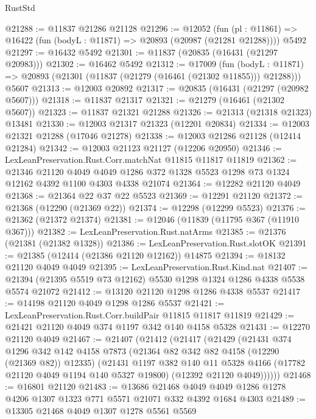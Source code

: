 \begin{lexlean}{RustStd}
\begin{coremodule}
{\begin{coremodule}
{{{{{{{{{{{{{{{{{{{{{{{{{{{{{{{{{{{{{{{{{{{{{{{{{{@21288 := @11837 @21286 @21128
@21296 := @12052
    (fun (pl : @11861) => @16422 (fun (bodyL : @11871) => @20893 (@20987 (@21281 @21288))))
    @5492
@21297 := @16432 @5492
@21301 := @11837 (@20835 (@16431 (@21297 @20983)))
@21302 := @16462 @5492
@21312 := @17009
    (fun (bodyL : @11871) => @20893 (@21301 (@11837 (@21279 (@16461 (@21302 @11855))) @21288)))
    @5607
@21313 := @12003 @20892
@21317 := @20835 (@16431 (@21297 (@20982 @5607)))
@21318 := @11837 @21317
@21321 := @21279 (@16461 (@21302 @5607))
@21323 := @11837 @21321 @21288
@21326 := @21313 (@21318 @21323) @13481
@21330 := @12003 @21317 @21323 (@12201 @20834)
@21334 := @12003 @21321 @21288 (@17046 @21278)
@21338 := @12003 @21286 @21128 (@12414 @21284)
@21342 := @12003 @21123 @21127 (@12206 @20950)
@21346 := LexLeanPreservation.Rust.Corr.matchNat @11815 @11817 @11819
@21362 := @21346
    @21120
    @4049
    @4049
    @1286
    @372
    @1328
    @5523
    @1298
    @73
    @1324
    @12162
    @4392
    @1100
    @4303
    @4338
    @21074
@21364 := @12282 @21120 @4049
@21368 := @21364 @22 @37 @22 @5523
@21369 := @12291 @21120
@21372 := @21368 (@12290 (@21369 @22))
@21374 := @12298 (@12299 @5523)
@21376 := @21362 (@21372 @21374)
@21381 := @12046 (@11839 (@11795 @367 (@11910 @367)))
@21382 := LexLeanPreservation.Rust.natArms
@21385 := @21376 (@21381 (@21382 @1328))
@21386 := LexLeanPreservation.Rust.slotOK
@21391 := @21385 (@12414 (@21386 @21120 @12162)) @14875
@21394 := @18132 @21120 @4049 @4049
@21395 := LexLeanPreservation.Rust.Kind.nat
@21407 := @21394 (@21395 @5519 @73 @12162) @5530 @1298 @1324 @1286 @4338 @5538 @5574 @21072
@21412 := @13120 @21120 @1298 @1286 @4338 @5537
@21417 := @14198 @21120 @4049 @1298 @1286 @5537
@21421 := LexLeanPreservation.Rust.Corr.buildPair @11815 @11817 @11819
@21429 := @21421 @21120 @4049 @374 @1197 @342 @140 @4158 @5328
@21431 := @12270 @21120 @4049
@21467 := @21407
    (@21412
      (@21417
        (@21429
          (@21431
            @374
            @1296
            @342
            @142
            @4158
            @7873
            (@21364 @82 @342 @82 @4158 (@12290 (@21369 @82)) @12335)
            (@21431
              @1197
              @382
              @140
              @11
              @5328
              @4166
              (@17782 @21120 @4049 @1194 @140 @5327 @19800)
              (@12392 @21120 @4049))))))
@21468 := @16801 @21120
@21483 := @13686
    @21468
    @4049
    @4049
    @1286
    @1278
    @4206
    @1307
    @1323
    @771
    @5571
    @21071
    @332
    @4392
    @1684
    @4303
@21489 := @13305 @21468 @4049 @1307 @1278 @5561 @5569
}}}}}}}}}}}}}}}}}}}}}}}}}}}}}}}}}}}}}}}}}}}}}}}}}}
\end{coremodule}}
\end{coremodule}
\end{lexlean}

